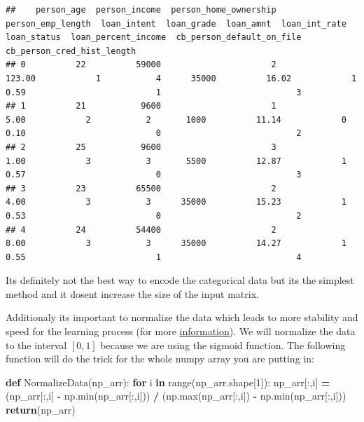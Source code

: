 \documentclass[
]{book}
\newenvironment{Shaded}{\begin{snugshade}}{\end{snugshade}}
\newcommand{\BuiltInTok}[1]{#1}
\newcommand{\ControlFlowTok}[1]{\textcolor[rgb]{0.13,0.29,0.53}{\textbf{#1}}}
\newcommand{\DecValTok}[1]{\textcolor[rgb]{0.00,0.00,0.81}{#1}}
\newcommand{\KeywordTok}[1]{\textcolor[rgb]{0.13,0.29,0.53}{\textbf{#1}}}
\newcommand{\NormalTok}[1]{#1}
\newcommand{\OperatorTok}[1]{\textcolor[rgb]{0.81,0.36,0.00}{\textbf{#1}}}
\begin{document}
\begin{verbatim}
##    person_age  person_income  person_home_ownership  person_emp_length  loan_intent  loan_grade  loan_amnt  loan_int_rate  loan_status  loan_percent_income  cb_person_default_on_file  cb_person_cred_hist_length
## 0          22          59000                      2             123.00            1           4      35000          16.02            1                 0.59                          1                           3
## 1          21           9600                      1               5.00            2           2       1000          11.14            0                 0.10                          0                           2
## 2          25           9600                      3               1.00            3           3       5500          12.87            1                 0.57                          0                           3
## 3          23          65500                      2               4.00            3           3      35000          15.23            1                 0.53                          0                           2
## 4          24          54400                      2               8.00            3           3      35000          14.27            1                 0.55                          1                           4
\end{verbatim}

Its definitely not the best way to encode the categorical data but its the simplest method and it dosent increase the size of the input matrix.

Additionaly its important to normalize the data which leads to more stability and speed for the learning process (for more \href{https://machinelearningmastery.com/how-to-improve-neural-network-stability-and-modeling-performance-with-data-scaling/}{information}). We will normalize the data to the interval \([0,1]\) because we are using the sigmoid function. The following function will do the trick for the whole numpy array you are putting in:

\begin{Shaded}
\begin{Highlighting}[]
\KeywordTok{def}\NormalTok{ NormalizeData(np\_arr):}
  \ControlFlowTok{for}\NormalTok{ i }\KeywordTok{in} \BuiltInTok{range}\NormalTok{(np\_arr.shape[}\DecValTok{1}\NormalTok{]):}
\NormalTok{    np\_arr[:,i] }\OperatorTok{=}\NormalTok{ (np\_arr[:,i] }\OperatorTok{{-}}\NormalTok{ np.}\BuiltInTok{min}\NormalTok{(np\_arr[:,i])) }\OperatorTok{/}\NormalTok{ (np.}\BuiltInTok{max}\NormalTok{(np\_arr[:,i]) }\OperatorTok{{-}}\NormalTok{ np.}\BuiltInTok{min}\NormalTok{(np\_arr[:,i]))}
  \ControlFlowTok{return}\NormalTok{(np\_arr)}
\end{Highlighting}
\end{Shaded}
\end{document}
